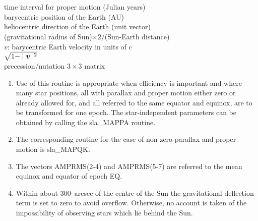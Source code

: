 {
}
{
  \\
  \\
      {time interval for proper motion (Julian years)} \\
    {barycentric position of the Earth (AU)} \\
    {heliocentric direction of the Earth (unit vector)} \\
      {(gravitational radius of
                      Sun)$\times 2 / $(Sun-Earth distance)} \\
   {\mbox{\boldmath $v$}: barycentric Earth
                                               velocity in units of c} \\
     {$\sqrt{1-\mid\mbox{\boldmath $v$}\mid^2}$} \\
  {precession/nutation $3\times3$ matrix}
}
{
}
\notes
{
 \begin{enumerate}
  \item Use of this routine is appropriate when efficiency is important
        and where many star positions, all with parallax and proper
        motion either zero or already allowed for, and all referred to
        the same equator and equinox, are to be transformed for one
        epoch.  The star-independent parameters can be obtained by
        calling the sla\_MAPPA routine.
  \item The corresponding routine for the case of non-zero parallax
        and proper motion is sla\_MAPQK.
  \item The vectors AMPRMS(2-4) and AMPRMS(5-7) are referred to the
        mean equinox and equator of epoch EQ.
  \item Within about 300~arcsec of the centre of the Sun the
        gravitational deflection term is set to zero to avoid
        overflow.  Otherwise, no account is taken of the
        impossibility of observing stars which lie behind
        the Sun.
 \end{enumerate}
}
